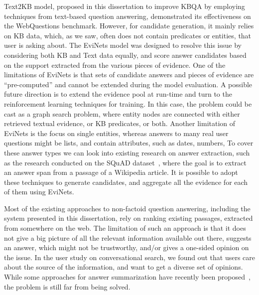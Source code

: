 Text2KB model, proposed in this dissertation to improve KBQA by employing techniques from text-based question answering, demonstrated its effectiveness on the WebQuestions benchmark.
However, for candidate generation, it mainly relies on KB data, which, as we saw, often does not contain predicates or entities, that user is asking about.
The EviNets model was designed to resolve this issue by considering both KB and Text data equally, and score answer candidates based on the support extracted from the various pieces of evidence.
One of the limitations of EviNets is that sets of candidate answers and pieces of evidence are ``pre-computed'' and cannot be extended during the model evaluation.
A possible future direction is to extend the evidence pool at run-time and turn to the reinforcement learning techniques for training.
In this case, the problem could be cast as a graph search problem, where entity nodes are connected with either retrieved textual evidence, or KB predicates, or both.
Another limitation of EviNets is the focus on single entities, whereas answers to many real user questions might be lists, and contain attributes, such as dates, numbers, \etc
To cover these answer types we can look into existing research on answer extraction, such as the research conducted on the SQuAD dataset~\cite{rajpurkar2016squad}, where the goal is to extract an answer span from a passage of a Wikipedia article.
It is possible to adopt these techniques to generate candidates, and aggregate all the evidence for each of them using EviNets.

Most of the existing approaches to non-factoid question answering, including the system presented in this dissertation, rely on ranking existing passages, extracted from somewhere on the web.
The limitation of such an approach is that it does not give a big picture of all the relevant information available out there, suggests an answer, which might not be trustworthy, and/or gives a one-sided opinion on the issue.
In the user study on conversational search, we found out that users care about the source of the information, and want to get a diverse set of opinions.
While some approaches for answer summarization have recently been proposed~\cite{mitra2016distillation,song2017summarizing,tomasoni2010metadata,wang2016query,gambhir2017recent}, the problem is still far from being solved.

